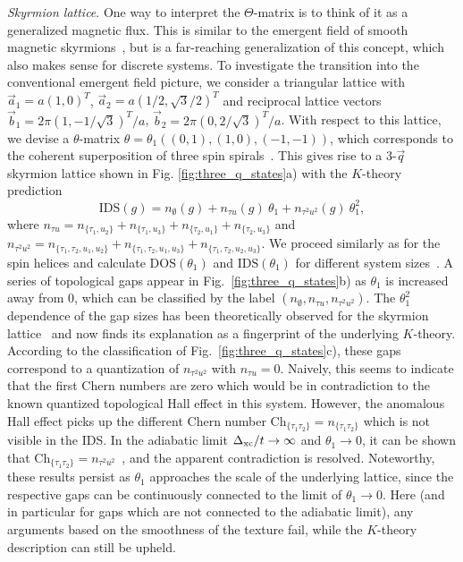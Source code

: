 \documentclass[
    10pt,
    aps,
    prr,
    twocolumn,
    floatfix,
    superscriptaddress
]{revtex4-2}
\newcommand{\SupplementalMaterial}{\cite{Note1}}
\newcommand{\revise}[1]{{\color{red} #1}}
\begin{document}
\revise{{\it Skyrmion lattice}.}
One way to interpret the $\Theta$-matrix is to think of it as a generalized magnetic flux.
This is similar to the emergent field of smooth magnetic skyrmions~\cite{Bliokh2005, Schulz2012}, but is a far-reaching generalization of this concept, which also makes sense for discrete systems.
To investigate the transition into the conventional emergent field picture, we consider a triangular lattice with $\vec{a}_1 = a (1,0)^T$, $\vec{a}_2 = a (1/2,\sqrt{3}/2 )^T$ and reciprocal lattice vectors
$\vec{b}_1 = 2 \pi (1, -1/\sqrt{3})^T / a$, $	\vec{b}_2 = 2 \pi (0, 2 / \sqrt{3})^T / a$.
With respect to this lattice, we devise a $\theta$-matrix
$ \theta = \theta_1 (( 
	0, 1),
	(  1,0 ),
	( -1,-1 )) $,
which corresponds to the coherent superposition of three spin spirals~\SupplementalMaterial. 
This gives rise to a 3-$\vec{q}$ skyrmion lattice shown in Fig. \ref{fig:three_q_states}a) with the $K$-theory prediction
\begin{equation}
     \mathrm{IDS}(g) = n_\emptyset(g) + n_{\tau u}(g)~\theta_1 + n_{\tau^2u^2}(g)~\theta_1^2,
    \label{eq:k_prediction_skx}
\end{equation}
where $n_{\tau u} = n_{ \lbrace \tau_1 , u_2\rbrace} + n_{\lbrace\tau_1 , u_3\rbrace}+n_{\lbrace\tau_2 , u_1\rbrace}+n_{\lbrace\tau_2 , u_3\rbrace}$ and $n_{\tau^2u^2} = n_{\lbrace\tau_1, \tau_2 , u_1 , u_2\rbrace} +  n_{\lbrace\tau_1 , \tau_2 ,  u_1 ,  u_3\rbrace} + n_{\lbrace\tau_1 , \tau_2 ,  u_2  , u_3 \rbrace}$.
We proceed similarly as for the spin helices and calculate $\mathrm{DOS}(\theta_1)$ and $\mathrm{IDS}(\theta_1)$ for different system sizes~\SupplementalMaterial.
A series of topological gaps appear in Fig.~\ref{fig:three_q_states}b) as $\theta_1$ is increased away from $0$, which can be classified by the label $(n_\emptyset, n_{\tau u}, n_{\tau^2u^2})$.
The $\theta_1^2$ dependence of the gap sizes has been theoretically observed for the skyrmion lattice~\cite{Hamamoto2015} and now finds its explanation as a fingerprint of the underlying $K$-theory.
According to the classification of Fig.~\ref{fig:three_q_states}c), 
these gaps correspond to a quantization of $n_{\tau^2u^2}$ with $n_{\tau u}=0$.
Naively, this seems to indicate that the first Chern numbers are zero which would be in contradiction to the known quantized topological Hall effect in this system.
However, the anomalous Hall effect picks up the different Chern number $\mathrm{Ch}_{ \lbrace \tau_1 \tau_2 \rbrace } = n_{ \lbrace \tau_1 \tau_2 \rbrace }$ \cite{Prodan2017} which is not visible in the IDS.
In the adiabatic limit $\Delta_\mathrm{xc}/t \to \infty$ and $\theta_1 \to 0$, it can be shown that $\mathrm{Ch}_{ \lbrace \tau_1 \tau_2 \rbrace } = n_{\tau^2u^2}$~\SupplementalMaterial, and the apparent contradiction is resolved.
Noteworthy, these results persist as $\theta_1$ approaches the scale of the underlying lattice, since the respective gaps can be continuously connected to the limit of $\theta_1 \to 0$.
Here (and in particular for gaps which are not connected to the adiabatic limit), any arguments based on the smoothness of the texture fail, while the $K$-theory description can still be upheld.
\end{document}
